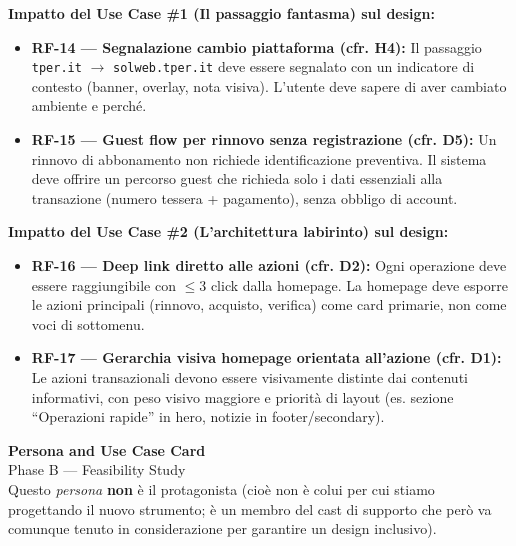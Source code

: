 ﻿\documentclass[11pt,a4paper]{article}
\begin{document}
\vspace{0.3cm}

\begin{tcolorbox}[base]
    {\small
    \textbf{Impatto del Use Case \#1 (Il passaggio fantasma) sul design:} \\[4pt]
    \begin{itemize}[leftmargin=*]
        \item \textbf{RF-14 --- Segnalazione cambio piattaforma (cfr. H4):} Il passaggio \texttt{tper.it} $\rightarrow$ \texttt{solweb.tper.it} deve essere segnalato con un indicatore di contesto (banner, overlay, nota visiva). L'utente deve sapere di aver cambiato ambiente e perché.

        \item \textbf{RF-15 --- Guest flow per rinnovo senza registrazione (cfr. D5):} Un rinnovo di abbonamento non richiede identificazione preventiva. Il sistema deve offrire un percorso guest che richieda solo i dati essenziali alla transazione (numero tessera + pagamento), senza obbligo di account.
    \end{itemize}
    \vspace{0.2cm}
    \textbf{Impatto del Use Case \#2 (L'architettura labirinto) sul design:} \\[4pt]
    \begin{itemize}[leftmargin=*]
        \item \textbf{RF-16 --- Deep link diretto alle azioni (cfr. D2):} Ogni operazione deve essere raggiungibile con $\leq$3 click dalla homepage. La homepage deve esporre le azioni principali (rinnovo, acquisto, verifica) come card primarie, non come voci di sottomenu.

        \item \textbf{RF-17 --- Gerarchia visiva homepage orientata all'azione (cfr. D1):} Le azioni transazionali devono essere visivamente distinte dai contenuti informativi, con peso visivo maggiore e priorità di layout (es. sezione ``Operazioni rapide'' in hero, notizie in footer/secondary).
    \end{itemize}
    }
\end{tcolorbox}

\begin{center}
    {\color{primaryColor}\Large\bfseries Persona and Use Case Card} \\[4pt]
    {\color{secondaryColor}\normalsize Phase B --- Feasibility Study} \\[4pt]
    {\color{secondaryColor}\small Questo \textit{persona} \textbf{non} \`e il protagonista (cio\`e non \`e colui per cui stiamo progettando il nuovo strumento; \`e un membro del cast di supporto che per\`o va comunque tenuto in considerazione per garantire un design inclusivo).}
\end{center}
\end{document}
